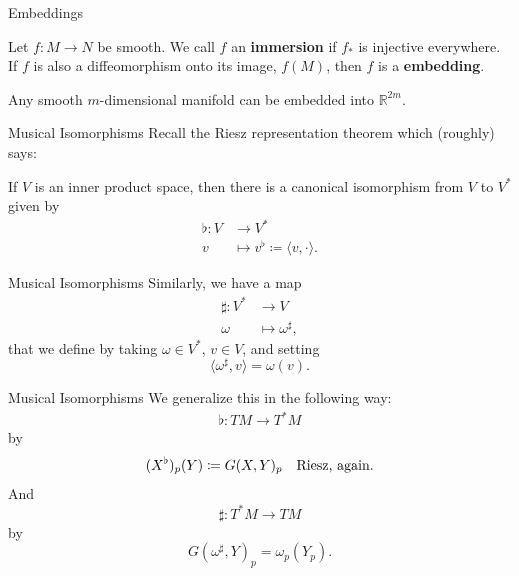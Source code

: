 \documentclass[usenames,dvipsnames]{beamer}
\theoremstyle{definition}
\theoremstyle{theorem}
\newcommand{\R}{\mathbb{R}}
\begin{document}
	    \begin{frame}{Embeddings}
	        \begin{definition}
	            Let $f\colon M \to N$ be smooth.  We call $f$ an \textbf{immersion} if $f_*$ is injective everywhere.  If $f$ is also a diffeomorphism onto its image, $f(M)$, then $f$ is a \textbf{embedding}.
	        \end{definition}
	        \begin{theorem}[Whitney]
	            Any smooth $m$-dimensional manifold can be embedded into $\R^{2m}$.
	        \end{theorem}
	    \end{frame}
	    
	
	    \begin{frame}{Musical Isomorphisms}
	        Recall the Riesz representation theorem which (roughly) says:
	        \begin{theorem}[Riesz]
	        If $V$ is an inner product space, then there is a canonical isomorphism from $V$ to $V^*$ given by
	        \begin{align*}
	        \flat \colon V &\to V^*\\
	        v &\mapsto v^\flat \coloneqq \langle v,\cdot \rangle.
	        \end{align*}
	        \end{theorem}
	    \end{frame}
	    
	    \begin{frame}{Musical Isomorphisms}
	        Similarly,
	        we have a map
	        \begin{align*}
	            \sharp \colon V^* &\to V\\
	            \omega &\mapsto \omega^\sharp,
	        \end{align*}
	        that we define by taking $\omega \in V^*$, $v\in V$, and setting
	        \[
	        \langle \omega^\sharp, v \rangle = \omega (v).
	        \]
	    \end{frame}
	    
	    \begin{frame}{Musical Isomorphisms}
	        We generalize this in the following way:
	        \begin{align*}
	            \flat \colon TM \to T^*M
	        \end{align*}
	        by
	        \[
	        (X^\flat)_p(Y)\coloneqq G(X,Y)_p \textrm{\quad Riesz, again}.
	        \]
	        And
	        \[
	            \sharp \colon T^*M \to TM
	        \]
	        by
	        \[
	        G(\omega^\sharp ,Y)_p = \omega_p(Y_p).
	        \]
	    \end{frame}
	    
\end{document}
